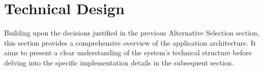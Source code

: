\section{Technical Design}

Building upon the decisions justified in the previous Alternative Selection section, this section provides a comprehensive overview of the application architecture. It aims to present a clear understanding of the system's technical structure before delving into the specific implementation details in the subsequent section.

 


 

